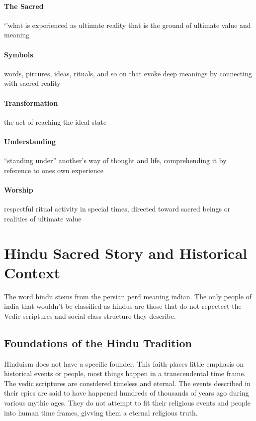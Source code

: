 \documentclass{article}
\begin{document}
\paragraph{The Sacred}
`'what is experienced as ultimate reality that is the ground of ultimate value and meaning

\paragraph{Symbols}
\label{par:symbols}
words, pircures, ideas, rituals, and so on that evoke deep meanings by connecting with sacred reality

\paragraph{Transformation}
\label{par:transformation}
the act of reaching the ideal state

\paragraph{Understanding}
\label{par:understanding}
``standing under'' another's way of thought and life, comprehending it by reference to ones own experience

\paragraph{Worship}
\label{par:worship}
respectful ritual activity in special times, directed toward sacred beings or realities of ultimate value

\section{Hindu Sacred Story and Historical Context}
\label{sec:hindu_sacred_story_and_historical_context}
The word hindu stems from the persian perd meaning indian. The only people of india that wouldn't be classified as hindus are those that do not repectect the Vedic scriptures and social class structure they describe.

\subsection{Foundations of the Hindu Tradition}
\label{sub:foundations_of_the_hindu_tradition}
Hinduism does not have a specific founder. This faith places little emphasis on historical events or people, most things happen in a transcendental time frame. The vedic scriptures are considered timeless and eternal. The events described in their epics are said to have happened hundreds of thousands of years ago during various mythic ages. They do not attempt to fit their religious events and people into human time frames, givving them a eternal religious truth.
\end{document}
